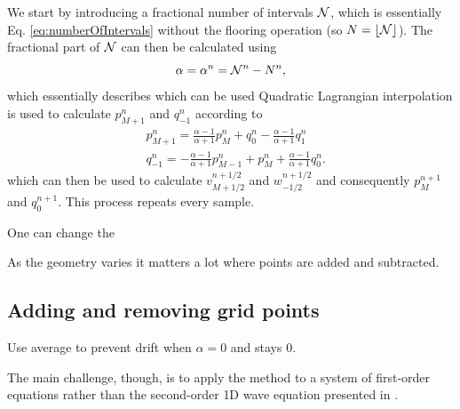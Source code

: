 We start by introducing a fractional number of intervals $\mathcal{N}$, which is essentially Eq. \eqref{eq:numberOfIntervals} without the flooring operation (so $N = \lfloor \mathcal{N} \rfloor$). The fractional part of $\mathcal{N}$ can then be calculated using
\begin{equation}
    \alpha = \alpha^n = \mathcal{N}^n - N^n,
\end{equation}
which essentially describes
which can be used 
Quadratic Lagrangian interpolation is used to calculate $p_{M+1}^n$ and $q_{-1}^n$ according to
\begin{subequations}\label{eq:connectionInterpol}
\begin{align}
        &p_{M+1}^n = \frac{\alpha - 1}{\alpha + 1}p_{M}^n + q_0^n - \frac{\alpha - 1}{\alpha + 1}q_1^n
    \label{eq:calcPMp1}\\
        &q_{-1}^n
        =-\frac{\alpha - 1}{\alpha + 1}p_{M-1}^n + p_{M}^n+ \frac{\alpha - 1}{\alpha + 1}q_{0}^n.\label{eq:calcQm1}
\end{align}
\end{subequations}
which can then be used to calculate $v_{M+1/2}^{n+1/2}$ and $w_{-1/2}^{n+1/2}$ and consequently $p_M^{n+1}$ and $q_0^{n+1}$. This process repeats every sample. 





One can change the 


As the geometry varies it matters a lot where points are added and subtracted. 


\subsection{Adding and removing grid points}
Use average to prevent drift when $\alpha = 0$ and stays 0.

The main challenge, though, is to apply the method to a system of first-order equations rather than the second-order 1D wave equation presented in \cite{Willemsen2021}. 